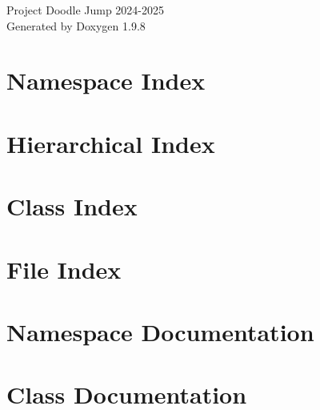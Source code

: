 \documentclass[twoside]{book}
\newcommand{\+}{\discretionary{\mbox{\scriptsize$\hookleftarrow$}}{}{}}
\newcommand{\clearemptydoublepage}{%
    \newpage{\pagestyle{empty}\cleardoublepage}%
  }
\begin{document}
  \raggedbottom
    \hypersetup{pageanchor=false,
                bookmarksnumbered=true,
                pdfencoding=unicode
               }
  \begin{titlepage}
  \vspace*{7cm}
  \begin{center}%
  {\Large Project Doodle Jump 2024-\/2025}\\
  \vspace*{1cm}
  {\large Generated by Doxygen 1.9.8}\\
  \end{center}
  \end{titlepage}
  \clearemptydoublepage
  \tableofcontents
  \clearemptydoublepage
  \hypersetup{pageanchor=true}

\chapter{Namespace Index}

\chapter{Hierarchical Index}

\chapter{Class Index}

\chapter{File Index}

\chapter{Namespace Documentation}


\chapter{Class Documentation}
























\end{document}
